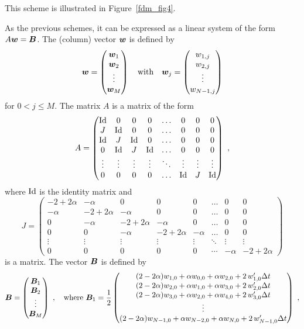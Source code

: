 This scheme is illustrated in Figure~\ref{fdm_fig4}.

As the previous schemes, it can be expressed as a linear system of the
form $A\bm{w} = \bm{B}$.  The (column) vector $\bm{w}$ is defined by
\[
\bm{w} = \begin{pmatrix}
\bm{w}_1 \\ \bm{w}_2 \\ \vdots \\ \bm{w}_M
\end{pmatrix}
\quad \text{with} \quad
\bm{w}_j =
\begin{pmatrix} w_{1,j} \\ w_{2,j} \\ \vdots \\ w_{N-1,j} \end{pmatrix}
\]
for $0 < j \leq M$.
The matrix $A$ is a  matrix of the form
\[
A = \begin{pmatrix}
\operatorname{Id} & 0 & 0 & 0 & \ldots & 0 & 0 & 0 \\
J & \operatorname{Id} & 0 & 0 & \ldots & 0 & 0 & 0 \\
\operatorname{Id} & J & \operatorname{Id} & 0 & \ldots & 0 & 0 & 0 \\
0 & \operatorname{Id} & J & \operatorname{Id} & \ldots & 0 & 0 & 0 \\
\vdots & \vdots & \vdots & \vdots & \ddots & \vdots & \vdots & \vdots \\
0 & 0 & 0 & 0 & \ldots & \operatorname{Id} & J & \operatorname{Id}
\end{pmatrix} \ ,
\]
where $\operatorname{Id}$ is the  identity matrix and
\[
J = \begin{pmatrix}
-2+2\alpha & -\alpha & 0 & 0 & 0 & \ldots & 0 & 0 \\
-\alpha & -2+2\alpha & -\alpha & 0 & 0 & \ldots & 0 & 0  \\
0 & -\alpha & -2+2\alpha & -\alpha & 0 & \ldots & 0 & 0 \\
0 & 0 & -\alpha & -2+2\alpha & -\alpha & \ldots & 0 & 0 \\
\vdots & \vdots & \vdots & \vdots & \vdots & \ddots & \vdots & \vdots \\
0 & 0 & 0 & 0 & 0 & \cdots & -\alpha & -2+2\alpha
\end{pmatrix}
\]
is a  matrix.  The vector $\bm{B}$ is defined by
\[
\VEC{B} = \begin{pmatrix} \VEC{B}_1 \\ \VEC{B}_2 \\ \vdots \\
\VEC{B}_M \end{pmatrix} \ , \quad \text{where} \ 
\VEC{B}_1 = \frac{1}{2} \begin{pmatrix}
(2-2\alpha) w_{1,0} + \alpha w_{0,0} + \alpha w_{2,0}
+ 2\,w_{1,0}' \dtx{t} \\
(2-2\alpha)w_{2,0} + \alpha w_{1,0} + \alpha w_{3,0}
+ 2\,w_{2,0}' \dtx{t} \\
(2-2\alpha)w_{3,0} + \alpha w_{2,0} + \alpha w_{4,0}
+ 2\,w_{3,0}' \dtx{t} \\
\vdots \\
(2-2\alpha)w_{N-1,0} + \alpha w_{N-2,0} + \alpha w_{N,0}
+ 2\,w_{N-1,0}' \dtx{t} \\
\end{pmatrix} \ ,
\]
